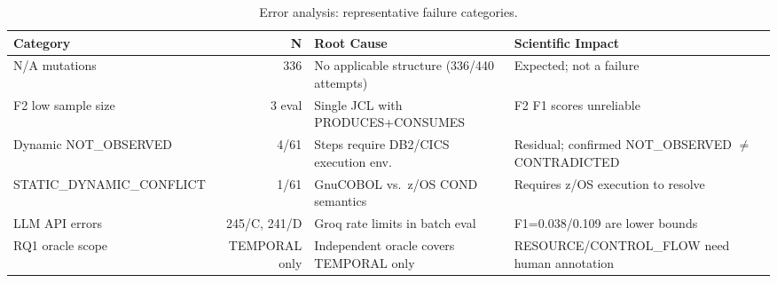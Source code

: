\begin{table}[t]
\small
\centering
\caption{Error analysis: representative failure categories.}
\label{table:errors}
\begin{tabular}{lrll}
\toprule
Category & N & Root Cause & Scientific Impact \\
\midrule
N/A mutations & 336 & No applicable structure (336/440 attempts) & Expected; not a failure \\
F2 low sample size & 3 eval & Single JCL with PRODUCES+CONSUMES & F2 F1 scores unreliable \\
Dynamic NOT\_OBSERVED & 4/61 & Steps require DB2/CICS execution env. & Residual; confirmed NOT\_OBSERVED $\neq$ CONTRADICTED \\
STATIC\_DYNAMIC\_CONFLICT & 1/61 & GnuCOBOL vs.\ z/OS COND semantics & Requires z/OS execution to resolve \\
LLM API errors & 245/C, 241/D & Groq rate limits in batch eval & F1=0.038/0.109 are lower bounds \\
RQ1 oracle scope & TEMPORAL only & Independent oracle covers TEMPORAL only & RESOURCE/CONTROL\_FLOW need human annotation \\
\bottomrule
\end{tabular}
\end{table}
